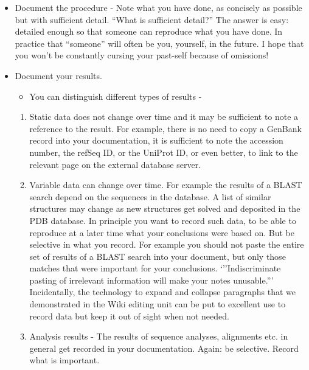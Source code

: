 \documentclass[]{book}
\providecommand{\tightlist}{%
  \setlength{\itemsep}{0pt}\setlength{\parskip}{0pt}}
\begin{document}
\begin{itemize}
\tightlist
\item
  Document the procedure - Note what you have done, as concisely as
  possible but with sufficient detail. ``What is sufficient detail?''
  The answer is easy: detailed enough so that someone can reproduce what
  you have done. In practice that ``someone'' will often be you,
  yourself, in the future. I hope that you won't be constantly cursing
  your past-self because of omissions!
\item
  Document your results.

  \begin{itemize}
  \tightlist
  \item
    You can distinguish different types of results -
  \end{itemize}

  \begin{enumerate}
  \def\labelenumi{\arabic{enumi}.}
  \tightlist
  \item
    Static data does not change over time and it may be sufficient to
    note a reference to the result. For example, there is no need to
    copy a GenBank record into your documentation, it is sufficient to
    note the accession number, the refSeq ID, or the UniProt ID, or even
    better, to link to the relevant page on the external database
    server.
  \item
    Variable data can change over time. For example the results of a
    BLAST search depend on the sequences in the database. A list of
    similar structures may change as new structures get solved and
    deposited in the PDB database. In principle you want to record such
    data, to be able to reproduce at a later time what your conclusions
    were based on. But be selective in what you record. For example you
    should not paste the entire set of results of a BLAST search into
    your document, but only those matches that were important for your
    conclusions. `''Indiscriminate pasting of irrelevant information
    will make your notes unusable.''' Incidentally, the technology to
    expand and collapse paragraphs that we demonstrated in the Wiki
    editing unit can be put to excellent use to record data but keep it
    out of sight when not needed.
  \item
    Analysis results - The results of sequence analyses, alignments etc.
    in general get recorded in your documentation. Again: be selective.
    Record what is important.
  \end{enumerate}
\end{itemize}
\end{document}
